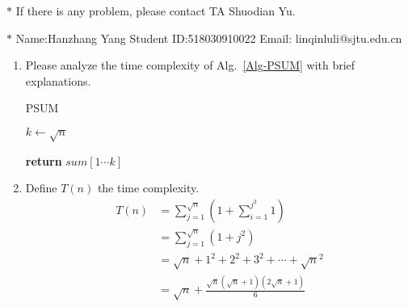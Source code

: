 \documentclass[12pt,a4paper]{article}
\makeatletter
\newtheorem*{solution}{Solution}
\theoremstyle{definition}
\renewenvironment{solution}[1][Solution] {\par\pushQED{\qed}\normalfont\topsep6\p@\@plus6\p@\relax\trivlist\item[\hskip\labelsep\bfseries#1\@addpunct{.}]\ignorespaces}{\popQED\endtrivlist\@endpefalse} \makeatother
\makeatother
\begin{document}
\noindent

\noindent{}
\begin{center}
\footnotesize{\color{red}$*$ If there is any problem, please contact TA Shuodian Yu.}

\footnotesize{\color{blue}$*$ Name:Hanzhang Yang  \quad Student ID:518030910022 \quad Email: linqinluli@sjtu.edu.cn}
\end{center}

\begin{enumerate}
    \item
    Please analyze the time complexity of Alg.~\ref{Alg-PSUM} with brief explanations.

    \begin{minipage}[t]{0.8\textwidth}
    \begin{algorithm}[H]
        \caption{PSUM}\label{Alg-PSUM}

        \BlankLine

        $k \leftarrow \sqrt{n}$\;


        {\bf return} $sum[1\cdots k]$\;
    \end{algorithm}
    \end{minipage}

   \begin{solution} 
    Define $T(n)$ the time complexity.
    \begin{align*}
       T(n) &= \sum_{j=1}^{\sqrt{n}} (1+\sum_{i=1}^{j^2} 1)\\
           &= \sum_{j=1}^{\sqrt{n}} (1+j^2) \\  
           &= \sqrt{n}+1^2+2^2+3^2+\cdots+\sqrt{n}^2  \\  
           &= \sqrt{n}+\frac {\sqrt{n}(\sqrt{n}+1)(2\sqrt{n}+1)} {6}  
          \end{align*}


\end{solution}
\end{enumerate}
\end{document}
